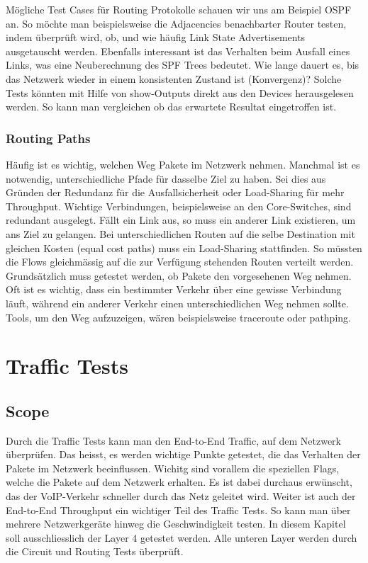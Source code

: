 \documentclass[a4,12pt]{scrartcl}
\begin{document}
\noindent Mögliche Test Cases für Routing Protokolle schauen wir uns am Beispiel OSPF an. So möchte man beispielsweise die Adjacencies benachbarter Router testen, indem überprüft wird, ob, und wie häufig Link State Advertisements ausgetauscht werden. Ebenfalls interessant ist das Verhalten beim Ausfall eines Links, was eine Neuberechnung des SPF Trees bedeutet. Wie lange dauert es, bis das Netzwerk wieder in einem konsistenten Zustand ist (Konvergenz)? Solche Tests könnten mit Hilfe von show-Outputs direkt aus den Devices herausgelesen werden. So kann man vergleichen ob das erwartete Resultat eingetroffen ist. 
\subsubsection{Routing Paths}
Häufig ist es wichtig, welchen Weg Pakete im Netzwerk nehmen. Manchmal ist es notwendig, unterschiedliche Pfade für dasselbe Ziel zu haben. Sei dies aus Gründen der Redundanz für die Ausfallsicherheit oder Load-Sharing für mehr Throughput. Wichtige Verbindungen, beispielsweise an den Core-Switches, sind redundant ausgelegt. Fällt ein Link aus, so muss ein anderer Link existieren, um ans Ziel zu gelangen. Bei unterschiedlichen Routen auf die selbe Destination mit gleichen Kosten (equal cost paths) muss ein Load-Sharing stattfinden. So müssten die Flows gleichmässig auf die zur Verfügung stehenden Routen verteilt werden.\\

\noindent Grundsätzlich muss getestet werden, ob Pakete den vorgesehenen Weg nehmen. Oft ist es wichtig, dass ein bestimmter Verkehr über eine gewisse Verbindung läuft, während ein anderer Verkehr einen unterschiedlichen Weg nehmen sollte.\\

\noindent Tools, um den Weg aufzuzeigen, wären beispielsweise traceroute oder pathping.  
\section{Traffic Tests}
\subsection{Scope}
Durch die Traffic Tests kann man den End-to-End Traffic, auf dem Netzwerk überprüfen. Das heisst, es werden wichtige Punkte getestet, die das Verhalten der Pakete im Netzwerk beeinflussen. Wichitg sind vorallem die speziellen Flags, welche die Pakete auf dem Netzwerk erhalten. Es ist dabei durchaus erwünscht, das der VoIP-Verkehr schneller durch das Netz geleitet wird.\newline
Weiter ist auch der End-to-End Throughput ein wichtiger Teil des Traffic Tests. So kann man über mehrere Netzwerkgeräte hinweg die Geschwindigkeit testen.\newline\newline
In diesem Kapitel soll ausschliesslich der Layer 4 getestet werden. Alle unteren Layer werden durch die Circuit und Routing Tests überprüft.
\end{document}
